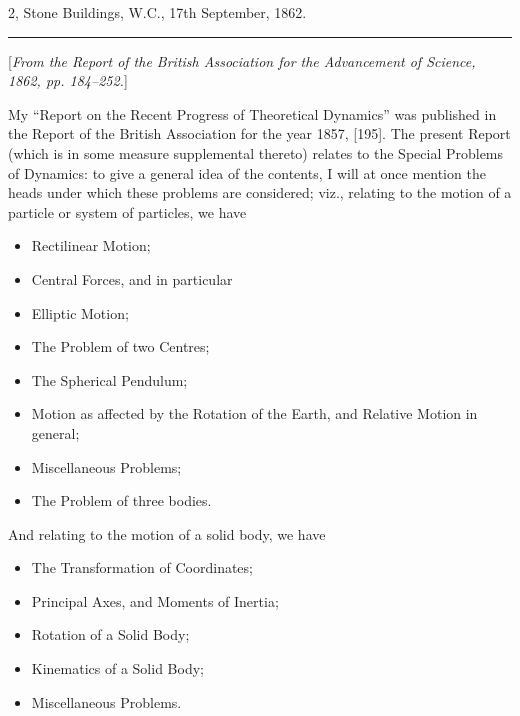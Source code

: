 \documentclass[11pt,a4paper]{book}
\begin{document}
\begin{flushright}
2, Stone Buildings, W.C., 17th September, 1862.
\end{flushright}

\vspace{1.5em}
\hrule
\vspace{1.5em}


{\small
[\textit{From the Report of the British Association for the Advancement of Science, 1862, pp. 184--252.}]
\par}
\vspace{0.5em}

\setcounter{page}{513}

My ``Report on the Recent Progress of Theoretical Dynamics'' was published in the Report of the British Association for the year 1857, [195]. The present Report (which is in some measure supplemental thereto) relates to the Special Problems of Dynamics: to give a general idea of the contents, I will at once mention the heads under which these problems are considered; viz., relating to the motion of a particle or system of particles, we have
\begin{itemize}[noitemsep]
\item Rectilinear Motion;
\item Central Forces, and in particular
\item[] Elliptic Motion;
\item The Problem of two Centres;
\item The Spherical Pendulum;
\item Motion as affected by the Rotation of the Earth, and Relative Motion in general;
\item Miscellaneous Problems;
\item The Problem of three bodies.
\end{itemize}
And relating to the motion of a solid body, we have
\begin{itemize}[noitemsep]
\item The Transformation of Coordinates;
\item Principal Axes, and Moments of Inertia;
\item Rotation of a Solid Body;
\item Kinematics of a Solid Body;
\item Miscellaneous Problems.
\end{itemize}
\end{document}
